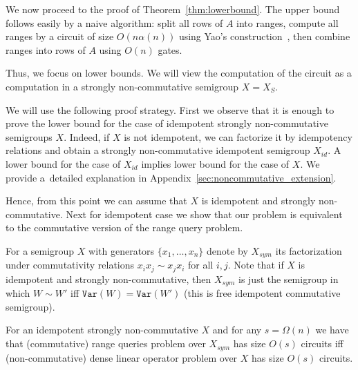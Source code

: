 \documentclass[a4paper,UKenglish,cleveref, autoref]{lipics-v2019}
\newcommand{\var}{\texttt{Var}}
\begin{document}

We now proceed to the proof of Theorem~\ref{thm:lowerbound}.
%
The upper bound follows easily by a naive algorithm: split all rows of $A$ into ranges, compute all ranges by a circuit of size $O(n\alpha(n))$ using Yao's construction~\cite{DBLP:conf/stoc/Yao82}, then combine ranges into rows of $A$ using $O(n)$ gates.

Thus, we focus on lower bounds. We will view the computation of the circuit as a computation in a strongly non-commutative semigroup $X=X_S$.

We will use the following proof strategy.
First we observe that it is enough to prove the lower bound for the case of idempotent strongly non-commutative semigroups $X$. Indeed, if $X$ is not idempotent, we can factorize it by idempotency relations and obtain a strongly non-commutative idempotent semigroup $X_{id}$. A lower bound for the case of $X_{id}$ implies lower bound for the case of $X$. %
We provide a~detailed explanation in Appendix~\ref{sec:noncommutative_extension}.

Hence, { from this point we can assume that $X$ is idempotent and strongly non-commutative}.
Next for idempotent case we show that our problem is equivalent to the commutative version of the range query problem.

For a semigroup $X$ with generators $\{x_1,\ldots, x_n\}$ denote by $X_{sym}$ its factorization under commutativity relations $x_i x_j \sim x_j x_i$ for all $i,j$. Note that if $X$ is idempotent and strongly non-commutative, then $X_{sym}$ is just the semigroup in which $W \sim W'$ iff $\var(W)=\var(W')$ (this is free idempotent commutative semigroup).

\begin{theorem}\label{thm:equivalence}
For an idempotent strongly non-commutative $X$ and for any $s=\Omega(n)$ we have that (commutative) range queries problem over $X_{sym}$ has size $O(s)$ circuits iff (non-commutative) dense linear operator problem over $X$ has size $O(s)$ circuits.
\end{theorem}
\end{document}
